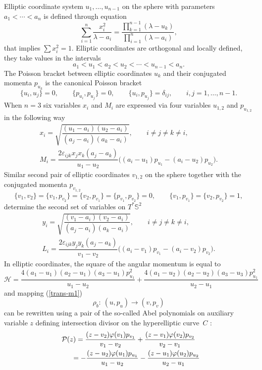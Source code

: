\documentclass[10pt,a4paper]{amsart}
\numberwithin{equation}{section}
\begin{document}
Elliptic coordinate system $u_1,\dots, u_{n-1}$ on the sphere
 with parameters $a_1<\cdots<a_n$ is defined through equation
\begin{equation}\label{ell-sph}
\sum_{i=1}^{n}\frac{x_i^2}{\lambda-a_i}=\frac{\prod_{k=1}^{n-1}(\lambda-u_k)}{\prod_{i=1}^n(\lambda-a_i)} ,
\end{equation}
that implies $\sum x_i^2=1$. Elliptic coordinates are orthogonal and locally defined, they take values in the intervals
\[a_1<u_1<a_2<u_2<\cdots< u_{n-1}<a_n .\]
The Poisson bracket between elliptic coordinates $u_{k}$ and their conjugated momenta $p_{u_{k}}$ is the canonical Poisson bracket
\[
\{u_i,u_j\}= 0 ,\qquad \{p_{u_i},p_{u_j}\}=0 ,\qquad \{u_i,p_{u_j}\}=\delta_{ij}  ,\qquad i,j=1,\dots,n-1.
\]
When $n=3$ six variables $x_i$ and $M_i$ are expressed via four variables $u_{1,2}$ and $p_{u_{1,2}}$ in the following way
\begin{gather}
x_i=\sqrt{\dfrac{(u_1-a_i)(u_2-a_i)}{(a_j-a_i)(a_k-a_i)}}
,\qquad i\neq j\neq k\neq i ,\nonumber\\
\label{xm-ell}
M_i=\dfrac{2\varepsilon_{ijk}x_jx_k(a_j-a_k)}{u_1-u_2}
\bigl((a_i-u_1)p_{u_1}-(a_i-u_2)p_{u_2}\bigr) .
\end{gather}
Similar second pair of elliptic coordinates $v_{1,2}$ on the sphere together with the conjugated momenta $p_{v_{1,2}}$
\[
\{v_1,v_2\}=\{v_1,p_{v_2}\}=\{v_2,p_{v_1}\}=\{p_{v_1},p_{v_2}\}=0 ,\qquad \{v_1,p_{v_1}\}=\{v_2,p_{v_2}\}=1 ,
\]
determine the second set of variables on $T^*\mathbb S^2$
\begin{gather*}
y_i=\sqrt{\dfrac{(v_1-a_i)(v_2-a_i)}{(a_j-a_i)(a_k-a_i)}},\qquad i\neq j\neq k\neq i ,\\
L_i=\dfrac{2\varepsilon_{ijk}y_jy_k(a_j-a_k)}{v_1-v_2}
\bigl((a_i-v_1)p_{v_1}-(a_i-v_2)p_{v_2}\bigr) .
\end{gather*}
In elliptic coordinates, the square of the angular momentum is equal to
\begin{equation}\label{eul-ham1}
\mathcal H=\frac{4(a_1-u_1)(a_2-u_1)(a_3 - u_1)p_{u_1}^2}{u_1-u_2}+\frac{ 4(a_1 - u_2)(a_2 - u_2)(a_3 - u_3)p_{u_1}^2}{u_2 - u_1}
\end{equation}
and mapping (\ref{trans-m1})
 \[\rho_{b}\colon \ (u,p_u)\to(v,p_v)\]
 can be rewritten using a pair of the so-called Abel polynomials on auxiliary variable $z$ defining intersection divisor on the hyperelliptic curve~$C$ \cite{ts17v,ts17c}:
\begin{gather}
\mathcal P(z)=\frac{(z - v_2)\varphi(v_1)p_{v_1}}{v_1 -v_2} + \frac{(z-v_1)\varphi(v_2)p_{v_2}}{v_2-v_1}\nonumber\\
\hphantom{\mathcal P(z)}{} =-
\frac{(z - u_2)\varphi(u_1)p_{u_1}}{u_1 - u_2} - \frac{(z-u_1)\varphi(u_2)p_{u_2}}{u_2-u_1}\label{pz}
\end{gather}
\end{document}
